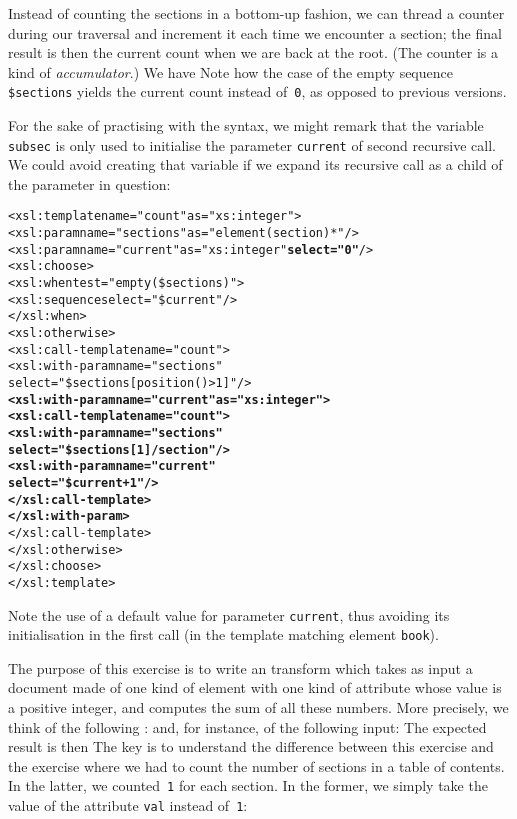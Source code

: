 Instead of counting the sections in a bottom\hyp{}up fashion, we can
thread a counter during our traversal and increment it each time we
encounter a section; the final result is then the current count when
we are back at the root. (The counter is a kind of
\emph{accumulator}.) We have
\noindent Note how the case of the empty sequence \texttt{\$sections}
yields the current count instead of~\texttt{0}, as opposed to
previous versions.

For the sake of practising with the \XSLT syntax, we might remark that
the variable \texttt{subsec} is only used to initialise the parameter
\texttt{current} of second recursive call. We could avoid creating that
variable if we expand its recursive call as a child of the parameter
in question:
\begin{alltt}
  <xsl:template name="count" as="xs:integer">
    <xsl:param name="sections" as="element(section)*"/>
    <xsl:param name="current"  as="xs:integer" \textbf{select="0"}/>
    <xsl:choose>
      <xsl:when test="empty(\$sections)">
        <xsl:sequence select="\$current"/>
      </xsl:when>
      <xsl:otherwise>
        <xsl:call-template name="count">
          <xsl:with-param name="sections"
                          select="\$sections[position()>1]"/>
          \textbf{<xsl:with-param name="current" as="xs:integer">
            <xsl:call-template name="count">
              <xsl:with-param name="sections" 
                              select="\$sections[1]/section"/>
              <xsl:with-param name="current" 
                              select="\$current + 1"/>
            </xsl:call-template>
          </xsl:with-param>}
        </xsl:call-template>
      </xsl:otherwise>
    </xsl:choose>
  </xsl:template>
\end{alltt}
Note the use of a default value for parameter \texttt{current}, thus
avoiding its initialisation in the first call (in the template
matching element \texttt{book}).


The purpose of this exercise is to write an \XSLT transform which
takes as input a document made of one kind of element with one kind of
attribute whose value is a positive integer, and computes the sum of
all these numbers. More precisely, we think of the following \DTD:
\noindent and, for instance, of the following input:
\noindent The expected result is then
The key is to understand the difference between this exercise and the
exercise where we had to count the number of sections in a table of
contents. In the latter, we counted~\texttt{1} for each section. In
the former, we simply take the value of the attribute \texttt{val}
instead of~\texttt{1}:

